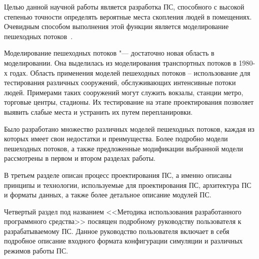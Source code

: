 \label{sec:intro}

Целью данной научной работы является разработка ПС, способного с высокой степенью точности определять вероятные места скопления людей в помещениях.
Очевидным способом выполнения этой функции является моделирование пешеходных потоков~\cite{shennon_modeling}.

Моделирование пешеходных потоков "--- достаточно новая область в моделировании. Она выделилась из моделирования транспортных потоков в 1980-х годах.
Область применения моделей пешеходных потоков – использование для тестирования различных сооружений, обслуживающих интенсивные потоки людей.
Примерами таких сооружений могут служить вокзалы, станции метро, торговые центры, стадионы. Их тестирование на этапе проектирования позволяет выявить слабые места и устранить их путем перепланировки.

Было разработано множество различных моделей пешеходных потоков, каждая из которых имеет свои недостатки и преимущества.
Более подробно модели пешеходных потоков, а также предложенные модификации выбранной модели рассмотрены в первом и втором разделах работы.

В третьем разделе описан процесс проектирования ПС, а именно описаны принципы и технологии, используемые для проектирования ПС, архитектура ПС и форматы данных, а также более детальное описание модулей ПС.

Четвертый раздел под названием <<Методика использования разработанного программного средства>> посвящен подробному руководству пользователя к разрабатываемому ПС. Данное руководство пользователя включает в себя подробное описание входного формата конфигурации симуляции и различных режимов работы ПС.
